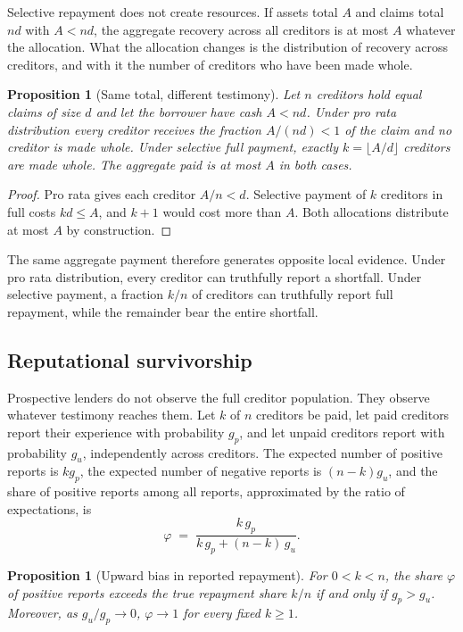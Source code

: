 \documentclass[11pt]{article}
\newtheorem{proposition}[theorem]{Proposition}
\theoremstyle{definition}
\theoremstyle{remark}
\begin{document}
Selective repayment does not create resources. If assets total $A$ and claims total $nd$ with $A<nd$, the aggregate recovery across all creditors is at most $A$ whatever the allocation. What the allocation changes is the distribution of recovery across creditors, and with it the number of creditors who have been made whole.

\begin{proposition}[Same total, different testimony]\label{prop:testimony}
Let $n$ creditors hold equal claims of size $d$ and let the borrower have cash $A<nd$. Under pro rata distribution every creditor receives the fraction $A/(nd)<1$ of the claim and no creditor is made whole. Under selective full payment, exactly $k=\lfloor A/d\rfloor$ creditors are made whole. The aggregate paid is at most $A$ in both cases.
\end{proposition}

\begin{proof}
Pro rata gives each creditor $A/n<d$. Selective payment of $k$ creditors in full costs $kd\le A$, and $k+1$ would cost more than $A$. Both allocations distribute at most $A$ by construction.
\end{proof}

The same aggregate payment therefore generates opposite local evidence. Under pro rata distribution, every creditor can truthfully report a shortfall. Under selective payment, a fraction $k/n$ of creditors can truthfully report full repayment, while the remainder bear the entire shortfall.

\subsection{Reputational survivorship}

Prospective lenders do not observe the full creditor population. They observe whatever testimony reaches them. Let $k$ of $n$ creditors be paid, let paid creditors report their experience with probability $g_p$, and let unpaid creditors report with probability $g_u$, independently across creditors. The expected number of positive reports is $kg_p$, the expected number of negative reports is $(n-k)g_u$, and the share of positive reports among all reports, approximated by the ratio of expectations, is
\[
\varphi \;=\; \frac{k\,g_p}{k\,g_p+(n-k)\,g_u}.
\]

\begin{proposition}[Upward bias in reported repayment]\label{prop:bias}
For $0<k<n$, the share $\varphi$ of positive reports exceeds the true repayment share $k/n$ if and only if $g_p>g_u$. Moreover, as $g_u/g_p\to 0$, $\varphi\to 1$ for every fixed $k\ge 1$.
\end{proposition}
\end{document}
